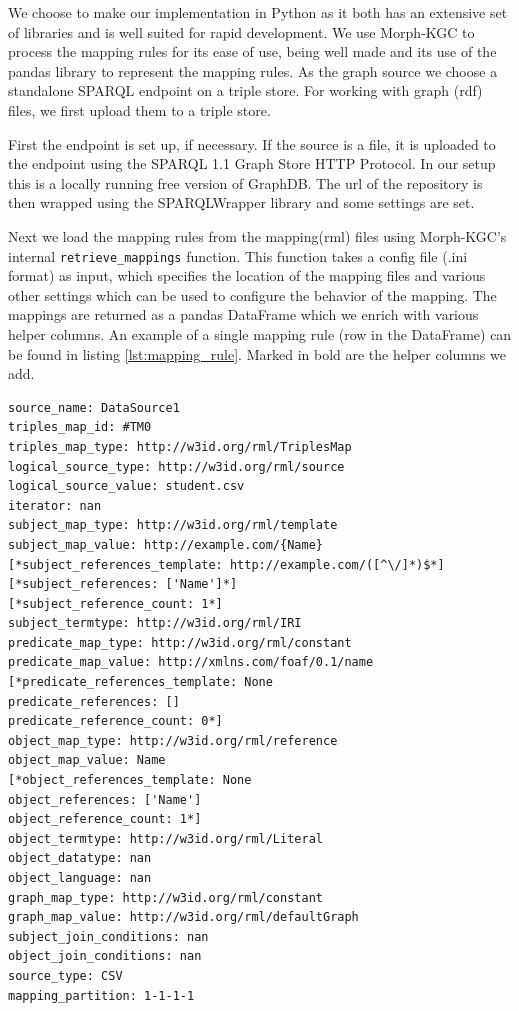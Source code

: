 We choose to make our implementation in Python as it both has an extensive set of libraries and is well suited for rapid development. We use Morph-KGC to process the mapping rules for its ease of use, being well made and its use of the pandas library to represent the mapping rules. As the graph source we choose a standalone SPARQL endpoint on a triple store. For working with graph (\acrshort{rdf}) files, we first upload them to a triple store.

First the endpoint is set up, if necessary. If the source is a file, it is uploaded to the endpoint using the SPARQL 1.1 Graph Store HTTP Protocol. In our setup this is a locally running free version of GraphDB. The url of the repository is then wrapped using the SPARQLWrapper library and some settings are set.

Next we load the mapping rules from the mapping(\acrshort{rml}) files using Morph-KGC's internal \texttt{retrieve\_mappings} function. This function takes a config file (.ini format) as input, which specifies the location of the mapping files and various other settings which can be used to configure the behavior of the mapping. The mappings are returned as a pandas DataFrame which we enrich with various helper columns. An example of a single mapping rule (row in the DataFrame) can be found in listing \ref{lst:mapping_rule}. Marked in bold are the helper columns we add.

\begin{lstlisting}[caption={Example of a mapping rule in Morph-KGC}, label={lst:mapping_rule}, captionpos=b, basicstyle=\small, frame=single]
source_name: DataSource1
triples_map_id: #TM0
triples_map_type: http://w3id.org/rml/TriplesMap
logical_source_type: http://w3id.org/rml/source
logical_source_value: student.csv
iterator: nan
subject_map_type: http://w3id.org/rml/template
subject_map_value: http://example.com/{Name}
[*subject_references_template: http://example.com/([^\/]*)$*]
[*subject_references: ['Name']*]
[*subject_reference_count: 1*]
subject_termtype: http://w3id.org/rml/IRI
predicate_map_type: http://w3id.org/rml/constant
predicate_map_value: http://xmlns.com/foaf/0.1/name
[*predicate_references_template: None
predicate_references: []
predicate_reference_count: 0*]
object_map_type: http://w3id.org/rml/reference
object_map_value: Name
[*object_references_template: None
object_references: ['Name']
object_reference_count: 1*]
object_termtype: http://w3id.org/rml/Literal
object_datatype: nan
object_language: nan
graph_map_type: http://w3id.org/rml/constant
graph_map_value: http://w3id.org/rml/defaultGraph
subject_join_conditions: nan
object_join_conditions: nan
source_type: CSV
mapping_partition: 1-1-1-1
\end{lstlisting}

